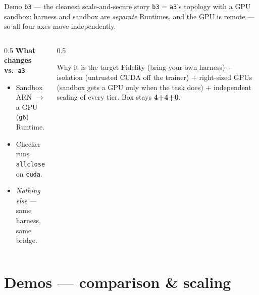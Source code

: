 \documentclass[aspectratio=169]{beamer}
\begin{document}
\begin{frame}{Demo \texttt{b3} --- the cleanest scale-and-secure story}
  \footnotesize \texttt{b3} = \texttt{a3}'s topology with a GPU sandbox: harness and sandbox are
  \emph{separate} Runtimes, and the GPU is remote --- so all four axes move independently.
  \begin{columns}[T]
    \begin{column}{0.5\textwidth}
      \textbf{What changes vs.\ \texttt{a3}}
      \begin{itemize}\setlength\itemsep{0.1em}
        \item Sandbox ARN $\to$ a GPU (\texttt{g6}) Runtime.
        \item Checker runs \texttt{allclose} on \texttt{cuda}.
        \item \emph{Nothing else} --- same harness, same bridge.
      \end{itemize}
    \end{column}
    \begin{column}{0.5\textwidth}
      \begin{block}{Why it is the target}
        \scriptsize Fidelity (bring-your-own harness) $+$ isolation (untrusted CUDA off the trainer)
        $+$ right-sized GPUs (sandbox gets a GPU only when the task does) $+$ independent scaling of
        every tier. Box stays \textbf{4+4+0}.
      \end{block}
    \end{column}
  \end{columns}
\end{frame}

\section{Demos --- comparison \& scaling}
\end{document}
